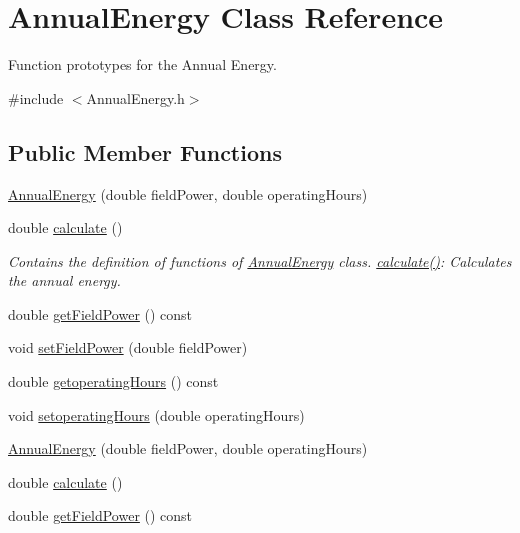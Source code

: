\hypertarget{class_annual_energy}{}\section{Annual\+Energy Class Reference}
\label{class_annual_energy}


Function prototypes for the Annual Energy.  




{\ttfamily \#include $<$Annual\+Energy.\+h$>$}

\subsection*{Public Member Functions}
\begin{DoxyCompactItemize}
\item 
\hyperlink{class_annual_energy_adb693a67965b0ff46436ee5141ab356d}{Annual\+Energy} (double field\+Power, double operating\+Hours)
\item 
double \hyperlink{class_annual_energy_ab599860ffb32ce20a1042a3e9d2ad57f}{calculate} ()
\begin{DoxyCompactList}\small\item\em Contains the definition of functions of \hyperlink{class_annual_energy}{Annual\+Energy} class. \hyperlink{class_annual_energy_ab599860ffb32ce20a1042a3e9d2ad57f}{calculate()}\+: Calculates the annual energy. \end{DoxyCompactList}\item 
double \hyperlink{class_annual_energy_a52aa52274243f578ea7f92d27707cacb}{get\+Field\+Power} () const
\item 
void \hyperlink{class_annual_energy_a4f7212fcf2f6fcd2b12f36ca26a368a1}{set\+Field\+Power} (double field\+Power)
\item 
double \hyperlink{class_annual_energy_a86a176d57507c7be77d0ead5f794af28}{getoperating\+Hours} () const
\item 
void \hyperlink{class_annual_energy_a803812f06ca88aca8a02601930e870cf}{setoperating\+Hours} (double operating\+Hours)
\item 
\hyperlink{class_annual_energy_adb693a67965b0ff46436ee5141ab356d}{Annual\+Energy} (double field\+Power, double operating\+Hours)
\item 
double \hyperlink{class_annual_energy_ab599860ffb32ce20a1042a3e9d2ad57f}{calculate} ()
\item 
double \hyperlink{class_annual_energy_a52aa52274243f578ea7f92d27707cacb}{get\+Field\+Power} () const

\end{DoxyCompactItemize}
